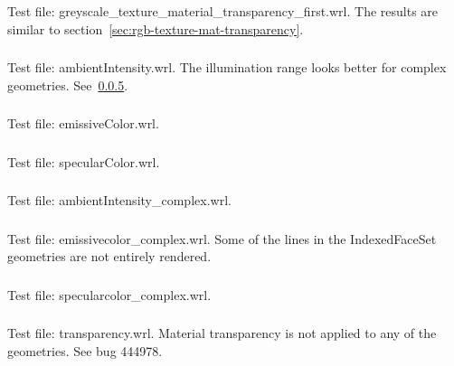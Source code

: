 \subsubsection{\MatUa\MatUb}
Test file: greyscale\_texture\_material\_transparency\_first.wrl.\newline
The results are similar to section~\ref{sec:rgb-texture-mat-transparency}.

\subsubsection{\MatV}
Test file: ambientIntensity.wrl.\newline
The illumination range looks better for complex geometries.
See~\ref{sec:amb-intensity-complex}.

\subsubsection{\MatW}
\label{sec:mat-emissive}
Test file: emissiveColor.wrl.

\subsubsection{\MatX}
Test file: specularColor.wrl.

\subsubsection{\MatY}
\label{sec:amb-intensity-complex}
Test file: ambientIntensity\_complex.wrl.

\subsubsection{\MatZ}
Test file: emissivecolor\_complex.wrl.\newline
Some of the lines in the IndexedFaceSet geometries are not entirely rendered.

\subsubsection{\MatAA}
Test file: specularcolor\_complex.wrl.

\subsubsection{\MatAB}
\label{sec:mat-transparency}
Test file: transparency.wrl.\newline
Material transparency is not applied to any of the geometries.
See bug 444978.

